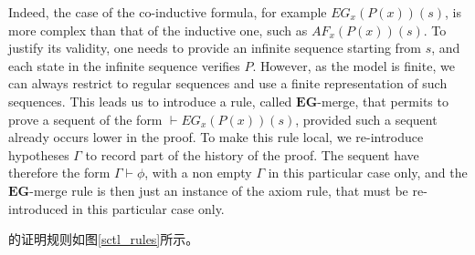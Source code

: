 Indeed, the case of the co-inductive formula, for example $EG_x(P(x))(s)$, is
more complex than that of the inductive one, such as $AF_x(P(x))(s)$.
To justify its validity, one needs to provide an infinite sequence starting from $s$, and each state in the infinite sequence
verifies $P$. However, as the model is finite, we can always restrict to
regular sequences and use a finite representation of such sequences. This
leads us to introduce a rule, called
$\mathbf{EG}$-\textsf{merge}, that permits to prove a sequent
of the form $\vdash EG_x(P(x))(s)$, provided such a sequent already
occurs lower in the proof. To make this rule local, we re-introduce
hypotheses $\Gamma$ to record part of the history of the proof. The
sequent have therefore the form $\Gamma\vdash\phi$, with a non empty
$\Gamma$ in this particular case only, and the
$\mathbf{EG}$-\textsf{merge} rule is then just an instance of
the axiom rule, that must be re-introduced in this particular case
only.


 的证明规则如图\ref{sctl_rules}所示。

